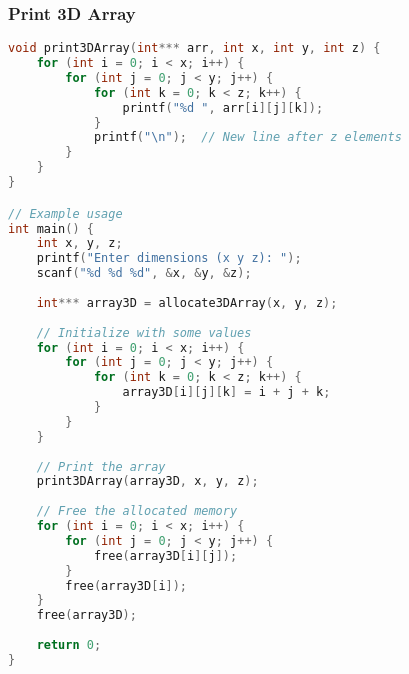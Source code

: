 \documentclass[12pt]{article}
\begin{document}
\subsubsection{Print 3D Array}
\begin{lstlisting}[language=C]
void print3DArray(int*** arr, int x, int y, int z) {
    for (int i = 0; i < x; i++) {
        for (int j = 0; j < y; j++) {
            for (int k = 0; k < z; k++) {
                printf("%d ", arr[i][j][k]);
            }
            printf("\n");  // New line after z elements
        }
    }
}

// Example usage
int main() {
    int x, y, z;
    printf("Enter dimensions (x y z): ");
    scanf("%d %d %d", &x, &y, &z);
    
    int*** array3D = allocate3DArray(x, y, z);
    
    // Initialize with some values
    for (int i = 0; i < x; i++) {
        for (int j = 0; j < y; j++) {
            for (int k = 0; k < z; k++) {
                array3D[i][j][k] = i + j + k;
            }
        }
    }
    
    // Print the array
    print3DArray(array3D, x, y, z);
    
    // Free the allocated memory
    for (int i = 0; i < x; i++) {
        for (int j = 0; j < y; j++) {
            free(array3D[i][j]);
        }
        free(array3D[i]);
    }
    free(array3D);
    
    return 0;
}
\end{lstlisting}
\end{document}
